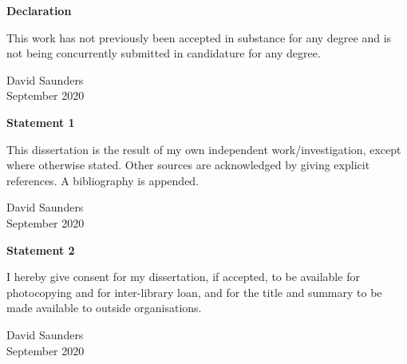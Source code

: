 \null\vspace{\fill}
\vspace{2cm}

\begin{center}
    \textbf{Declaration}
  \end{center}


This work has not previously been accepted in substance for any degree and is not being concurrently submitted in candidature for any degree.

\vspace{1cm}
\begin{flushright}
 David Saunders\\
 September 2020
\end{flushright}

\begin{center}
    \textbf{Statement 1}
  \end{center}

This dissertation is the result of my own independent work/investigation, except where otherwise stated. 
Other sources are acknowledged by giving explicit references. 
A bibliography is appended.

\vspace{1cm}
\begin{flushright}
 David Saunders\\
 September 2020
\end{flushright}

\begin{center}
    \textbf{Statement 2}
  \end{center}

I hereby give consent for my dissertation, if accepted, to be available for photocopying and for inter-library loan, and for the title and summary to be made available to outside organisations.

\vspace{1cm}
\begin{flushright}
 David Saunders\\
 September 2020
\end{flushright}


\vspace{\fill}